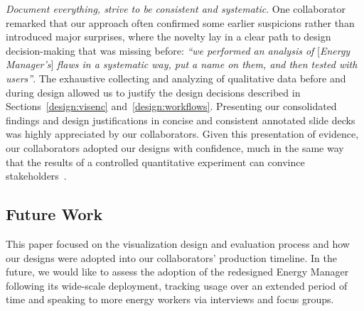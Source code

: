 \documentclass[journal]{vgtc}                %
\newcommand{\bstart}[1]{\vspace{1mm} \noindent{\textbf{#1:}}}
\newcommand{\tm}[1]{\textcolor{red}{#1}}
\newcommand{\etal}{et al.}
\begin{document}

\bstart{Grounding design decisions} {\it Document everything, strive to be consistent and systematic}. 
One collaborator remarked that our approach often confirmed some earlier suspicions rather than introduced major surprises, where the novelty lay in a clear path to design decision-making that was missing before: {\it ``we performed an analysis of} [{\it Energy Manager's}] {\it flaws in a systematic way, put a name on them, and then tested with users''}. 
The exhaustive collecting and analyzing of qualitative data before and during design allowed us to justify the design decisions described in Sections~\ref{design:visenc} and~\ref{design:workflows}. 
Presenting our consolidated findings and design justifications in concise and consistent annotated slide decks was highly appreciated by our collaborators.
Given this presentation of evidence, our collaborators adopted our designs with confidence, much in the same way that the results of a controlled quantitative experiment can convince stakeholders~\cite{Sedlmair2011}. 


\subsection{Future Work}
\label{discussion-future-work}


This paper focused on the visualization design and evaluation process and how our designs were adopted into our collaborators' production timeline.
In the future, we would like to assess the adoption of the redesigned Energy Manager following its wide-scale deployment, tracking usage over an extended period of time and speaking to more energy workers via interviews and focus groups.
\end{document}
